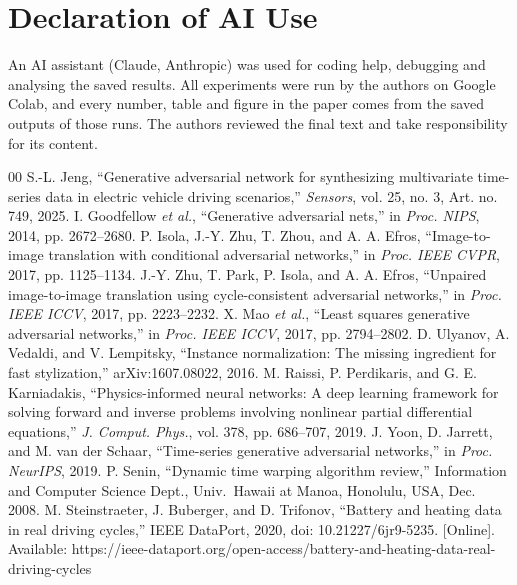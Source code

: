 \documentclass[conference]{IEEEtran}
\begin{document}
\section*{Declaration of AI Use}
An AI assistant (Claude, Anthropic) was used for coding help, debugging and analysing the saved results. All experiments were run by the authors on Google Colab, and every number, table and figure in the paper comes from the saved outputs of those runs. The authors reviewed the final text and take responsibility for its content.

\begin{thebibliography}{00}
 S.-L. Jeng, ``Generative adversarial network for synthesizing multivariate time-series data in electric vehicle driving scenarios,'' \emph{Sensors}, vol. 25, no. 3, Art. no. 749, 2025.
 I. Goodfellow \emph{et al.}, ``Generative adversarial nets,'' in \emph{Proc. NIPS}, 2014, pp. 2672--2680.
 P. Isola, J.-Y. Zhu, T. Zhou, and A. A. Efros, ``Image-to-image translation with conditional adversarial networks,'' in \emph{Proc. IEEE CVPR}, 2017, pp. 1125--1134.
 J.-Y. Zhu, T. Park, P. Isola, and A. A. Efros, ``Unpaired image-to-image translation using cycle-consistent adversarial networks,'' in \emph{Proc. IEEE ICCV}, 2017, pp. 2223--2232.
 X. Mao \emph{et al.}, ``Least squares generative adversarial networks,'' in \emph{Proc. IEEE ICCV}, 2017, pp. 2794--2802.
 D. Ulyanov, A. Vedaldi, and V. Lempitsky, ``Instance normalization: The missing ingredient for fast stylization,'' arXiv:1607.08022, 2016.
 M. Raissi, P. Perdikaris, and G. E. Karniadakis, ``Physics-informed neural networks: A deep learning framework for solving forward and inverse problems involving nonlinear partial differential equations,'' \emph{J. Comput. Phys.}, vol. 378, pp. 686--707, 2019.
 J. Yoon, D. Jarrett, and M. van der Schaar, ``Time-series generative adversarial networks,'' in \emph{Proc. NeurIPS}, 2019.
 P. Senin, ``Dynamic time warping algorithm review,'' Information and Computer Science Dept., Univ.\ Hawaii at Manoa, Honolulu, USA, Dec. 2008.
 M. Steinstraeter, J. Buberger, and D. Trifonov, ``Battery and heating data in real driving cycles,'' IEEE DataPort, 2020, doi: 10.21227/6jr9-5235. [Online]. Available: https://ieee-dataport.org/open-access/battery-and-heating-data-real-driving-cycles
\end{thebibliography}
\end{document}
